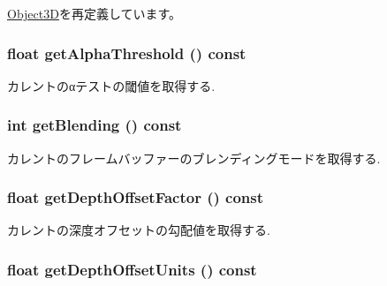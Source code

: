 \hyperlink{classm3g_1_1Object3D_a25110dac934f867b83b73ad4741a0f4}{Object3D}を再定義しています。\hypertarget{classm3g_1_1CompositingMode_19ab71363ea77fa86aa6fafce87f06cb}{
\subsubsection[{getAlphaThreshold}]{\setlength{\rightskip}{0pt plus 5cm}float getAlphaThreshold () const}}
\label{classm3g_1_1CompositingMode_19ab71363ea77fa86aa6fafce87f06cb}


カレントのαテストの閾値を取得する. \hypertarget{classm3g_1_1CompositingMode_078954de3d786bd11dc98b06f237bbbb}{
\subsubsection[{getBlending}]{\setlength{\rightskip}{0pt plus 5cm}int getBlending () const}}
\label{classm3g_1_1CompositingMode_078954de3d786bd11dc98b06f237bbbb}


カレントのフレームバッファーのブレンディングモードを取得する. \hypertarget{classm3g_1_1CompositingMode_d24a4116e72678164f31d7a48f74be6b}{
\subsubsection[{getDepthOffsetFactor}]{\setlength{\rightskip}{0pt plus 5cm}float getDepthOffsetFactor () const}}
\label{classm3g_1_1CompositingMode_d24a4116e72678164f31d7a48f74be6b}


カレントの深度オフセットの勾配値を取得する. \hypertarget{classm3g_1_1CompositingMode_add4c6c3bc01c1d0689e0588af79039f}{
\subsubsection[{getDepthOffsetUnits}]{\setlength{\rightskip}{0pt plus 5cm}float getDepthOffsetUnits () const}}
\label{classm3g_1_1CompositingMode_add4c6c3bc01c1d0689e0588af79039f}


